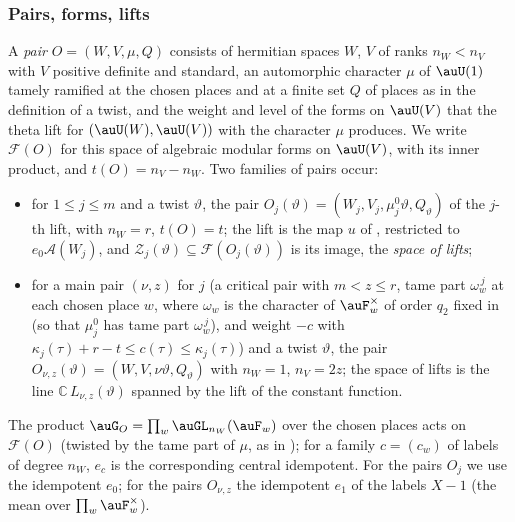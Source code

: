 \documentclass[10pt]{amsart}
\theoremstyle{definition}
\theoremstyle{remark}
\newcommand{\C}{\mathbb C}
\begin{document}
\subsubsection*{Pairs, forms, lifts}
A \emph{pair} $O=(W,V,\mu,Q)$ consists of hermitian spaces $W$, $V$ of ranks $n_W<n_V$ with $V$
positive definite and standard, an automorphic character $\mu$ of $\auU(1)$ tamely ramified at the
chosen places and at a finite set $Q$ of places as in the definition of a twist, and the weight
and level of the forms on $\auU(V)$ that the theta lift for $(\auU(W),\auU(V))$ with the character
$\mu$ produces. We write $\mathcal F(O)$ for this space of algebraic modular forms on $\auU(V)$,
with its inner product, and $t(O)=n_V-n_W$. Two families of pairs occur:
\begin{itemize}
\item for $1\le j\le m$ and a twist $\vartheta$, the pair $O_j(\vartheta)=(W_j,V_j,\mu_j^0\vartheta,
Q_\vartheta)$ of the $j$-th lift, with $n_W=r$, $t(O)=t$; the lift is the map $u$ of
{\cite[Proposition~14.37]{P46}}, restricted to $e_0\mathcal A(W_j)$, and $\mathcal Z_j(\vartheta)\subseteq
\mathcal F(O_j(\vartheta))$ is its image, the \emph{space of lifts};
\item for a main pair $(\nu,z)$ for $j$ (a critical pair with $m<z\le r$, tame part $\omega_w^{\,j}$
at each chosen place $w$, where $\omega_w$ is the character of $\auF_w^\times$ of order $q_2$ fixed in
{\cite[\S14.3]{P46}} (so that $\mu_j^0$ has tame part $\omega_w^{\,j}$), and weight $-c$
with $\kappa_j(\tau)+r-t\le c(\tau)\le\kappa_j(\tau)$) and a twist $\vartheta$, the pair
$O_{\nu,z}(\vartheta)=(W,V,\nu\vartheta,Q_\vartheta)$ with $n_W=1$, $n_V=2z$; the space of lifts
is the line $\C\,L_{\nu,z}(\vartheta)$ spanned by the lift of the constant function.
\end{itemize}
The product $\auG_O=\prod_w\auGL_{n_W}(\auF_w)$ over the chosen places acts on $\mathcal F(O)$
(twisted by the tame part of $\mu$, as in {\cite[Proposition~14.27]{P46}}); for a family $c=(c_w)$ of
labels of degree $n_W$, $e_c$ is the corresponding central idempotent. For the pairs $O_j$ we use
the idempotent $e_0$; for the pairs $O_{\nu,z}$ the idempotent $e_1$ of the labels $X-1$ (the mean
over $\prod_w\auF_w^\times$).
\end{document}
